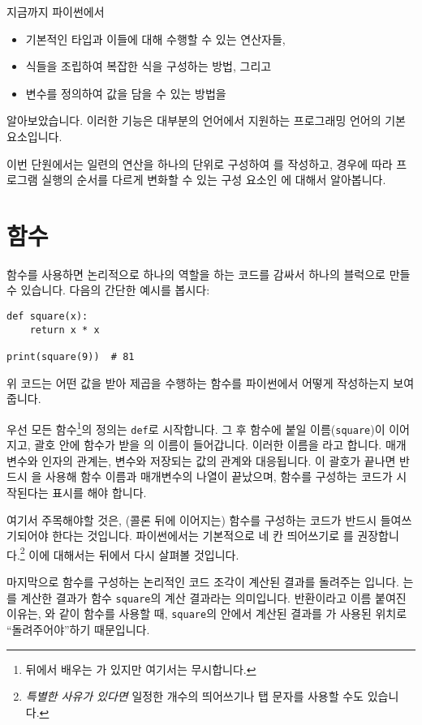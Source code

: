 \documentclass[../main.tex]{subfiles}
\begin{document}
지금까지 파이썬에서
\begin{itemize}
\item 기본적인 타입과 이들에 대해 수행할 수 있는 연산자들,
\item 식들을 조립하여 복잡한 식을 구성하는 방법, 그리고
\item 변수를 정의하여 값을 담을 수 있는 방법을
\end{itemize}
알아보았습니다.
이러한 기능은 대부분의 언어에서 지원하는 프로그래밍 언어의 기본 요소입니다.

이번 단원에서는 일련의 연산을 하나의 단위로 구성하여 를 작성하고,
경우에 따라 프로그램 실행의 순서를 다르게 변화할 수 있는 구성 요소인 에 대해서 알아봅니다.

\section{함수}
함수를 사용하면 논리적으로 하나의 역할을 하는 코드를 감싸서 하나의 블럭으로 만들 수 있습니다.
다음의 간단한 예시를 봅시다:
\begin{verbatim}
def square(x):
    return x * x

print(square(9))  # 81
\end{verbatim}
위 코드는 어떤 값을 받아 제곱을 수행하는 함수를 파이썬에서 어떻게 작성하는지 보여줍니다.

우선 모든 함수\footnote{뒤에서 배우는 가 있지만 여기서는 무시합니다.}의 정의는 \verb/def/로 시작합니다.
그 후 함수에 붙일 이름(\verb/square/)이 이어지고, 괄호 안에 함수가 받을 의 이름이 들어갑니다.
이러한 이름을 라고 합니다.
매개변수와 인자의 관계는, 변수와 저장되는 값의 관계와 대응됩니다.
이 괄호가 끝나면 반드시 을 사용해 함수 이름과 매개변수의 나열이 끝났으며, 함수를 구성하는 코드가 시작된다는 표시를 해야 합니다.

여기서 주목해야할 것은, (콜론 뒤에 이어지는) 함수를 구성하는 코드가 반드시 들여쓰기되어야 한다는 것입니다.
파이썬에서는 기본적으로 네 칸 띄어쓰기로 를 권장합니다.\footnote{\emph{특별한 사유가 있다면} 일정한 개수의 띄어쓰기나 탭 문자를 사용할 수도 있습니다.}
이에 대해서는 뒤에서 다시 살펴볼 것입니다.

마지막으로 함수를 구성하는 논리적인 코드 조각이 계산된 결과를 돌려주는 입니다.
는 를 계산한 결과가 함수 \verb/square/의 계산 결과라는 의미입니다.
반환이라고 이름 붙여진 이유는, 와 같이 함수를 사용할 때, \verb/square/의 안에서 계산된 결과를 가 사용된 위치로 ``돌려주어야''하기 때문입니다.
\end{document}
